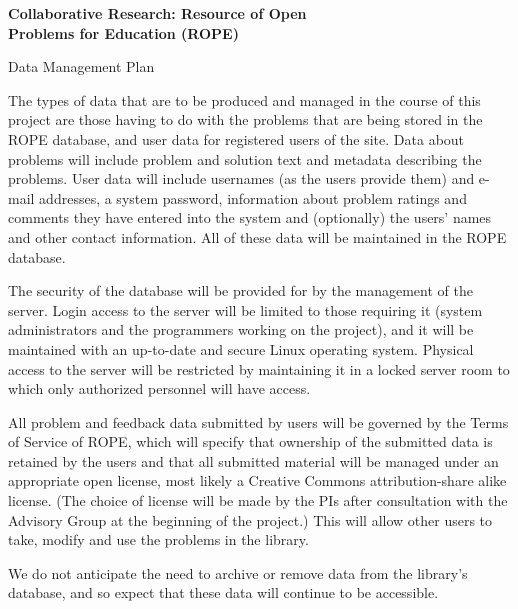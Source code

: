 \documentclass[11pt]{article}
\begin{document}
\begin{center}
\Large\textbf{ Collaborative Research: Resource of Open\\
Problems for Education (ROPE) }
\end{center}

\begin{section}{Data Management Plan}

The types of data that are to be produced and managed in the course of
this project are those having to do with the problems that are being
stored in the ROPE database, and user data for registered users of the
site.  Data about problems will include problem and solution text and
metadata describing the problems.  User data will include usernames (as
the users provide them) and e-mail addresses, a system password,
information about problem ratings and comments they have entered into the
system and (optionally) the users' names and other contact information.
All of these data will be maintained in the ROPE database.

The security of the database will be provided for by the management of the
server.  Login access to the server will be limited to those requiring it
(system administrators and the programmers working on the project), and it
will be maintained with an up-to-date and secure Linux operating system.
Physical access to the server will be restricted by maintaining it in a
locked server room to which only authorized personnel will have access.

All problem and feedback data submitted by users will be governed by the
Terms of Service of ROPE, which will specify that ownership of the
submitted data is retained by the users and that all submitted material
will be managed under an appropriate open license, most likely a Creative
Commons attribution-share alike license.  (The choice of license will be
made by the PIs after consultation with the Advisory Group at the
beginning of the project.)  This will allow other users to take, modify
and use the problems in the library.

We do not anticipate the need to archive or remove data from the library's
database, and so expect that these data will continue to be accessible.

\end{section}
\end{document}
